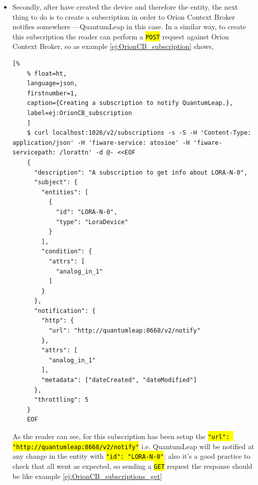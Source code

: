 \documentclass[11pt,a4paper,dvipsnames,twoside]{article}
\newcommand{\cmd}[1] {\hl{\texttt{#1}}}
\begin{document}
\begin{itemize}
  \item Secondly, after have created the device and therefore the entity, the next thing to do is to create a subscription in order to Orion Context Broker notifies somewhere ---QuantumLeap in this case. In a similar way, to create this subscription the reader can perform a \cmd{POST} request against Orion Context Broker, so as example \ref{ej:OrionCB_subscription} shows, 
  
  \begin{lstlisting}[%
    % float=ht,
    language=json,
    firstnumber=1,
    caption={Creating a subscription to notify QuantumLeap.},
    label=ej:OrionCB_subscription
    ]
    $ curl localhost:1026/v2/subscriptions -s -S -H 'Content-Type: application/json' -H 'fiware-service: atosioe' -H 'fiware-servicepath: /lorattn' -d @- <<EOF
    {
      "description": "A subscription to get info about LORA-N-0",
      "subject": {
        "entities": [
          {
            "id": "LORA-N-0",
            "type": "LoraDevice"
          }
        ],
        "condition": {
          "attrs": [
            "analog_in_1"
          ]
        }
      },
      "notification": {
        "http": {
          "url": "http://quantumleap:8668/v2/notify"
        },
        "attrs": [
          "analog_in_1"
        ],
        "metadata": ["dateCreated", "dateModified"]
      },
      "throttling": 5
    }
    EOF
  \end{lstlisting}

  As the reader can see, for this subscription has been setup the \cmd{"url": "http://quantumleap:8668/v2/notify"} i.e. QuantumLeap will be notified at any change in the entity with \cmd{"id": "LORA-N-0"}; also it's a good practice to check that all went as expected, so sending a \cmd{GET} request the response should be like example \ref{ej:OrionCB_subscriptions_get} 


\end{itemize}
\end{document}
